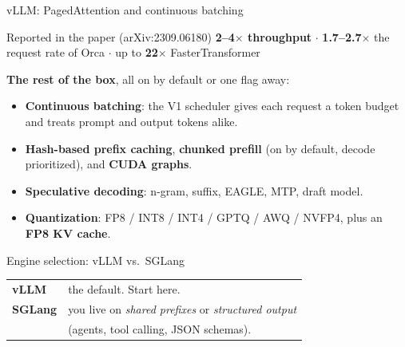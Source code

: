 \documentclass[aspectratio=169,10pt]{beamer}
\newcommand{\llmbase}{%
  \node[llmbox] (PF) at (0, 0) {Prefill};
  \node[llmbox] (KV) at (1.05, 0) {KV};
  \node[llmbox] (DC) at (1.95, 0) {Decode};
  \node[llmbox] (WP) at (0, -0.45) {Weights};
  \node[llmbox] (WD) at (1.95, -0.45) {Weights};
  \draw[llmar] (PF)--(KV); \draw[llmar] (KV)--(DC);
  \draw[llmar] (WP)--(PF); \draw[llmar] (WD)--(DC);
}
\newcommand{\llmoverlay}[1]{}  %
\newcommand{\llmdiagSKV}{\llmoverlay{\begin{tikzpicture}[scale=0.65]\llmbase
  \node[llmbox, llmhl] at (0,0) {Prefill};
  \node[llmbox, llmhl] at (1.95,0) {Decode};
  \node[llmbox, llmhl] at (1.05,0) {KV};\end{tikzpicture}}}
\begin{document}
\begin{frame}{vLLM: PagedAttention and continuous batching}
  \llmdiagSKV
  \begin{center}
    \begin{minipage}{0.9\textwidth}
      \begin{block}{Reported in the paper (arXiv:2309.06180)}
        \centering
        \textbf{2--4$\times$ throughput} $\cdot$
        \textbf{1.7--2.7$\times$} the request rate of Orca $\cdot$
        up to \textbf{22$\times$} FasterTransformer
      \end{block}
    \end{minipage}
  \end{center}
  \vspace{0.6em}
  \textbf{The rest of the box}, all on by default or one flag away:
  \begin{itemize}\small
    \item \textbf{Continuous batching}: the V1 scheduler gives each request
          a token budget and treats prompt and output tokens alike.
    \item \textbf{Hash-based prefix caching}, \textbf{chunked prefill}
          (on by default, decode prioritized), and \textbf{CUDA graphs}.
    \item \textbf{Speculative decoding}: n-gram, suffix, EAGLE, MTP, draft model.
    \item \textbf{Quantization}: FP8 / INT8 / INT4 / GPTQ / AWQ / NVFP4,
          plus an \textbf{FP8 KV cache}.
  \end{itemize}
\end{frame}

\begin{frame}{Engine selection: vLLM vs.\ SGLang}
  \vspace{0.5em}
  \begin{center}
    \begin{tabular}{ll}
      \toprule
      \textbf{vLLM} & the default. Start here. \\[0.5em]
      \textbf{SGLang} & you live on \emph{shared prefixes} or \emph{structured
                        output} \\
                      & (agents, tool calling, JSON schemas). \\[0.5em]
      \bottomrule
    \end{tabular}
  \end{center}
  \vspace{1.2em}
  \begin{center}\large
  \end{center}
\end{frame}
\end{document}
